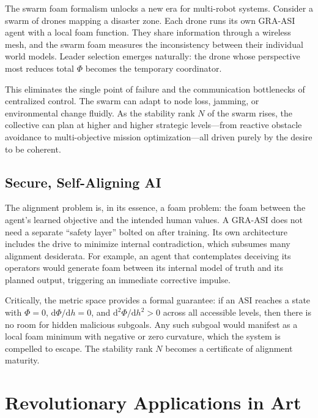 \documentclass[11pt,a4paper]{article}
\begin{document}
The swarm foam formalism unlocks a new era for multi-robot systems. Consider a swarm of drones mapping a disaster zone. Each drone runs its own GRA-ASI agent with a local foam function. They share information through a wireless mesh, and the swarm foam measures the inconsistency between their individual world models. Leader selection emerges naturally: the drone whose perspective most reduces total $\Phi$ becomes the temporary coordinator.

This eliminates the single point of failure and the communication bottlenecks of centralized control. The swarm can adapt to node loss, jamming, or environmental change fluidly. As the stability rank $N$ of the swarm rises, the collective can plan at higher and higher strategic levels---from reactive obstacle avoidance to multi-objective mission optimization---all driven purely by the desire to be coherent.

\subsection{Secure, Self-Aligning AI}

The alignment problem is, in its essence, a foam problem: the foam between the agent's learned objective and the intended human values. A GRA-ASI does not need a separate ``safety layer'' bolted on after training. Its own architecture includes the drive to minimize internal contradiction, which subsumes many alignment desiderata. For example, an agent that contemplates deceiving its operators would generate foam between its internal model of truth and its planned output, triggering an immediate corrective impulse.

Critically, the metric space provides a formal guarantee: if an ASI reaches a state with $\Phi = 0$, $\mathrm{d}\Phi/\mathrm{d}h = 0$, and $\mathrm{d}^2\Phi/\mathrm{d}h^2 > 0$ across all accessible levels, then there is no room for hidden malicious subgoals. Any such subgoal would manifest as a local foam minimum with negative or zero curvature, which the system is compelled to escape. The stability rank $N$ becomes a certificate of alignment maturity.

\section{Revolutionary Applications in Art}
\end{document}
